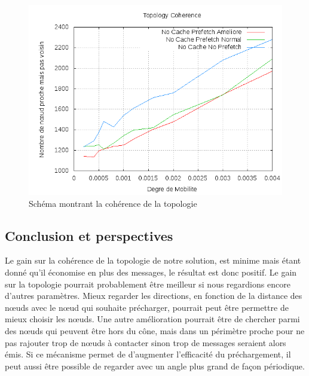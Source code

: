 	\begin{figure}[!h]
        \centering
        \includegraphics[scale=0.5]{../CacheCode/SolipsisPeersim/resultats/Courbes/Courbes_Final_Rapport/Topology_Coherence_Prefetchs.png}
	\caption{Schéma montrant la cohérence de la topologie}
	\label{courbeTopoPrefetch}
        \end{figure}



\subsection{Conclusion et perspectives}
Le gain sur la cohérence de la topologie de notre solution, est minime mais étant donné qu'il économise en plus des messages, le résultat est donc positif. Le gain sur la topologie pourrait probablement être meilleur si nous regardions encore d'autres paramètres. Mieux regarder les directions, en fonction de la distance des nœuds avec le nœud qui souhaite précharger, pourrait peut être permettre de mieux choisir les nœuds.
Une autre amélioration pourrait être de chercher parmi des nœuds qui peuvent être hors du cône, mais dans un périmètre proche pour ne pas rajouter trop de nœuds à contacter sinon trop de messages seraient alors émis. Si ce mécanisme permet de d'augmenter l'efficacité du préchargement, il peut aussi être possible de regarder avec un angle plus grand de façon périodique.


\newpage
